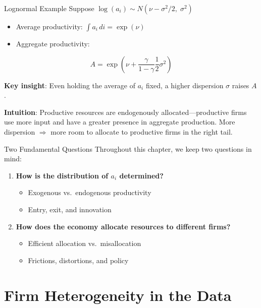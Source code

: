 \documentclass[blue]{beamer}
\begin{document}
\begin{frame}{Lognormal Example}
	Suppose $\log(a_i) \sim N(\nu - \sigma^2/2, \; \sigma^2)$
	
	\begin{itemize}
		\item Average productivity: $\int a_i \, di = \exp(\nu)$
		\item Aggregate productivity:
	\end{itemize}
	\[
	{A = \exp\left( \nu + \frac{\gamma}{1-\gamma} \frac{1}{2} \sigma^2 \right)}
	\]
	
	\bigskip
	\textbf{Key insight}: Even holding the average of $a_i$ fixed, a higher dispersion $\sigma$ raises $A$.
	
	\bigskip
	\textbf{Intuition}: Productive resources are endogenously allocated---productive firms use more input and have a greater presence in aggregate production. More dispersion $\Rightarrow$ more room to allocate to productive firms in the right tail.
\end{frame}

\begin{frame}{Two Fundamental Questions}
	Throughout this chapter, we keep two questions in mind:
	
	\bigskip
	\begin{enumerate}
		\item \textbf{How is the distribution of $a_i$ determined?}
		\begin{itemize}
			\item Exogenous vs.\ endogenous productivity
			\item Entry, exit, and innovation
		\end{itemize}
		
		\bigskip
		\item \textbf{How does the economy allocate resources to different firms?}
		\begin{itemize}
			\item Efficient allocation vs.\ misallocation
			\item Frictions, distortions, and policy
		\end{itemize}
	\end{enumerate}
\end{frame}


\section{Firm Heterogeneity in the Data}
\end{document}
